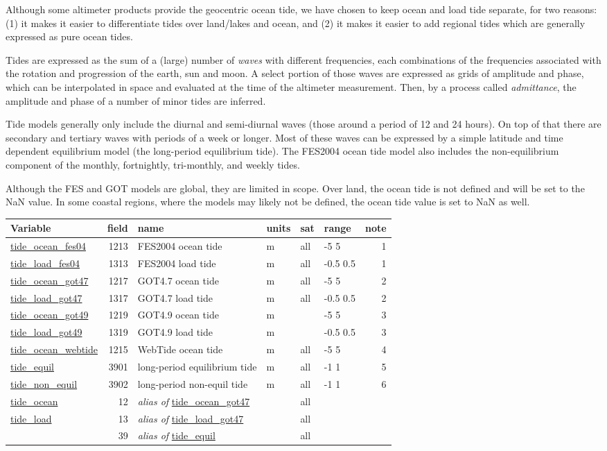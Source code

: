 \documentclass[a4paper,11pt,openany,natbib]{thesis}
\makeatletter
\newcommand\var[1]{\url{#1}\index{variables!#1@\protect\url{#1}}}
\newcommand\alias[1]{\emph{alias of} \var{#1}}
\newenvironment{vartable}{
\begin{table}[ht]
\small
\begin{tabular}{lrllllr}
\hline
Variable & field & name & units & sat & range & note \\
\hline
}{
\hline
\end{tabular}
\end{table}
}
\makeatother
\begin{document}
Although some altimeter products provide the geocentric ocean tide, we have chosen to keep ocean and load tide separate, for two reasons: (1) it makes it easier to differentiate tides over land/lakes and ocean, and (2) it makes it easier to add regional tides which are generally expressed as pure ocean tides.

Tides are expressed as the sum of a (large) number of \emph{waves} with different frequencies, each combinations of the frequencies associated with the rotation and progression of the earth, sun and moon. A select portion of those waves are expressed as grids of amplitude and phase, which can be interpolated in space and evaluated at the time of the altimeter measurement. Then, by a process called \emph{admittance}, the amplitude and phase of a number of minor tides are inferred.

Tide models generally only include the diurnal and semi-diurnal waves (those around a period of 12 and 24 hours). On top of that there are secondary and tertiary waves with periods of a week or longer. Most of these waves can be expressed by a simple latitude and time dependent equilibrium model (the long-period equilibrium tide). The FES2004 ocean tide model also includes the non-equilibrium component of the monthly, fortnightly, tri-monthly, and weekly tides.

Although the FES and GOT models are global, they are limited in scope. Over land, the ocean tide is not defined and will be set to the NaN value. In some coastal regions, where the models may likely not be defined, the ocean tide value is set to NaN as well.

\begin{vartable}
\var{tide_ocean_fes04} & 1213 & FES2004 ocean tide & m & all & -5 5 & 1 \\
\var{tide_load_fes04}  & 1313 & FES2004 load  tide & m & all & -0.5 0.5 & 1 \\
\var{tide_ocean_got47} & 1217 & GOT4.7  ocean tide & m & all & -5 5 & 2 \\
\var{tide_load_got47}  & 1317 & GOT4.7  load  tide & m & all & -0.5 0.5 & 2 \\
\var{tide_ocean_got49} & 1219 & GOT4.9  ocean tide & m & & -5 5 & 3 \\
\var{tide_load_got49}  & 1319 & GOT4.9  load  tide & m & & -0.5 0.5 & 3 \\
\var{tide_ocean_webtide} & 1215 & WebTide ocean tide & m & all & -5 5 & 4 \\
\var{tide_equil}       & 3901 & long-period equilibrium tide & m & all & -1 1 & 5 \\
\var{tide_non_equil}   & 3902 & long-period non-equil tide & m & all & -1 1 & 6 \\
\hline
\var{tide_ocean} & 12 & \alias{tide_ocean_got47} && all && \\
\var{tide_load}  & 13 & \alias{tide_load_got47} && all && \\
                 & 39 & \alias{tide_equil} && all && \\
\end{vartable}
\end{document}
